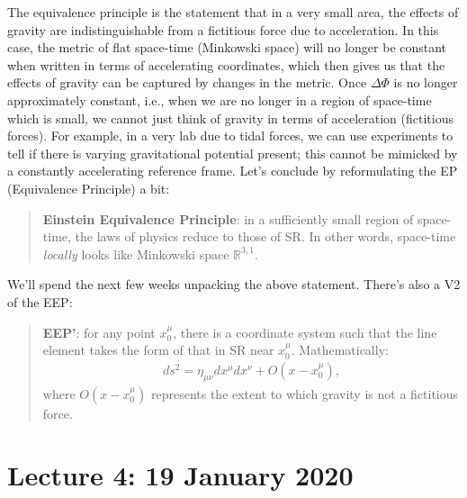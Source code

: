 \documentclass[11pt]{article}
\newcommand{\R}[0]{\mathbb{R}}
\newcommand{\srmetric}[0]{\eta_{\mu \nu}}
\theoremstyle{definition}
\begin{document}
\newline
\newline
The equivalence principle is the statement that in a very small area, the effects of gravity are indistinguishable from a fictitious force due to acceleration. In this case, the metric of flat space-time (Minkowski space) will no longer be constant when written in terms of accelerating coordinates, which then gives us that the effects of gravity can be captured by changes in the metric. 
\newline
\newline
Once \( \Delta \Phi \) is no longer approximately constant, i.e., when we are no longer in a region of space-time which is small, we cannot just think of gravity in terms of acceleration (fictitious forces). For example, in a very lab due to tidal forces, we can use experiments to tell if there is varying gravitational potential present; this cannot be mimicked by a constantly accelerating reference frame.
\newline
\newline
Let's conclude by reformulating the EP (Equivalence Principle) a bit: 
\begin{quote}
	\textbf{Einstein Equivalence Principle}: in a sufficiently small region of space-time, the laws of physics reduce to those of SR. In other words, space-time \emph{locally} looks like Minkowski space \( \R^{3,1} \). 
\end{quote}
We'll spend the next few weeks unpacking the above statement. There's also a V2 of the EEP: 
\begin{quote}
	\textbf{EEP'}: for any point \( x_0^\mu \), there is a coordinate system such that the line element takes the form of that in SR near \( x_0^\mu \). Mathematically: 
	\begin{align*}
		ds^2 = \srmetric dx^\mu dx^\nu + O(x-x_0^\mu), 
	\end{align*}
	where \( O(x-x_0^\mu) \) represents the extent to which gravity is not a fictitious force. 
\end{quote}


\section{Lecture 4: 19 January 2020}
\end{document}
